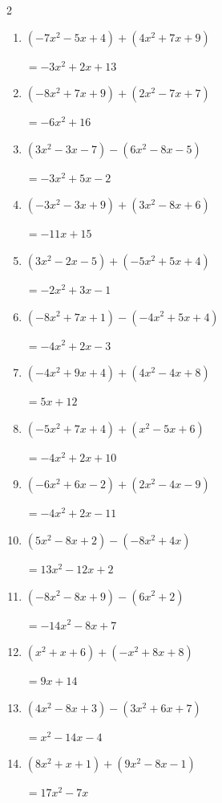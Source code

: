 \begin{multicols}{2}
\begin{enumerate}
        $=6x^{2}+11x+2$

  \item $(-7x^{2}-5x+4)+(4x^{2}+7x+9)$

        $=-3x^{2}+2x+13$

  \item $(-8x^{2}+7x+9)+(2x^{2}-7x+7)$

        $=-6x^{2}+16$

  \item $(3x^{2}-3x-7)-(6x^{2}-8x-5)$

        $=-3x^{2}+5x-2$

  \item $(-3x^{2}-3x+9)+(3x^{2}-8x+6)$

        $=-11x+15$

  \item $(3x^{2}-2x-5)+(-5x^{2}+5x+4)$

        $=-2x^{2}+3x-1$

  \item $(-8x^{2}+7x+1)-(-4x^{2}+5x+4)$

        $=-4x^{2}+2x-3$

  \item $(-4x^{2}+9x+4)+(4x^{2}-4x+8)$

        $=5x+12$

  \item $(-5x^{2}+7x+4)+(x^{2}-5x+6)$

        $=-4x^{2}+2x+10$

  \item $(-6x^{2}+6x-2)+(2x^{2}-4x-9)$

        $=-4x^{2}+2x-11$

  \item $(5x^{2}-8x+2)-(-8x^{2}+4x)$

        $=13x^{2}-12x+2$

  \item $(-8x^{2}-8x+9)-(6x^{2}+2)$

        $=-14x^{2}-8x+7$

  \item $(x^{2}+x+6)+(-x^{2}+8x+8)$

        $=9x+14$

  \item $(4x^{2}-8x+3)-(3x^{2}+6x+7)$

        $=x^{2}-14x-4$

  \item $(8x^{2}+x+1)+(9x^{2}-8x-1)$

        $=17x^{2}-7x$


\end{enumerate}
\end{multicols}
